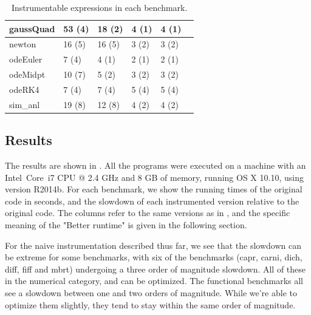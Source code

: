 \begin{table}
\begin{tabular}{| l | l | l | l | l | l |}
  gaussQuad   & 53 (4) & 18 (2) & 4 (1) & 4 (1) \\ \hline
  newton      & 16 (5) & 16 (5) & 3 (2) & 3 (2) \\ \hline
  odeEuler    & 7 (4) & 4 (1) & 2 (1) & 2 (1) \\\hline
  odeMidpt    & 10 (7) & 5 (2) & 3 (2) & 3 (2) \\ \hline
  odeRK4      & 7 (4) & 7 (4) & 5 (4) & 5 (4) \\ \hline
  sim\_anl    & 19 (8) & 12 (8) & 4 (2) & 4 (2) \\ \hline
\end{tabular}
\caption{Instrumentable expressions in each benchmark.}
\label{tab:InstrumentationBenchmarksInstrumentable}
\end{table}

\subsection{Results}

The results are shown in . All the
programs were executed on a machine with an Intel\textregistered \,
Core\texttrademark \, i7 CPU @ 2.4 GHz and 8 GB of memory, running OS X 10.10,
using \matlab version R2014b. For each benchmark, we show the running times of
the original code in seconds, and the slowdown of each instrumented version
relative to the original code. The columns refer to the same versions as in
, and the specific
meaning of the "Better runtime" is given in the following section.

For the naive instrumentation described thus far, we see that the slowdown can
be extreme for some benchmarks, with six of the benchmarks (capr, carni, dich,
diff, fiff and mbrt) undergoing a three order of magnitude slowdown. All of
these in the numerical category, and can be optimized. The functional
benchmarks all see a slowdown between one and two orders of magnitude. While
we're able to optimize them slightly, they tend to stay within the same order
of magnitude.

